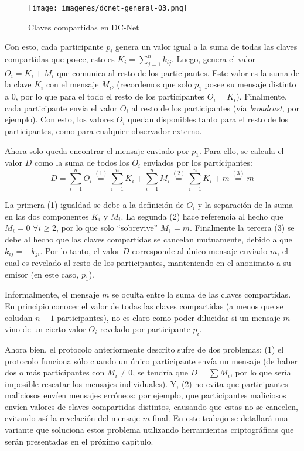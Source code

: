 \begin{figure}[H]
  \centering
    \texttt{[image: imagenes/dcnet-general-03.png]}
  \caption{Claves compartidas en DC-Net}
\end{figure}

Con esto, cada participante $p_i$ genera un valor igual a la suma de todas las claves compartidas que posee, esto es $K_i = \sum_{j=1}^n k_{ij}$. 
Luego, genera el valor $O_i = K_i + M_i$ que comunica al resto de los participantes. Este valor es la suma de la clave $K_i$ con el mensaje $M_i$, (recordemos que solo $p_1$ posee su mensaje distinto a 0, por lo que para el todo el resto de los participantes $O_i = K_i$). 
Finalmente, cada participante envia el valor $O_i$ al resto de los participantes (vía \emph{broadcast}, por ejemplo). Con esto, los 
valores $O_i$ quedan disponibles tanto para el resto de los participantes, como para cualquier observador externo.

Ahora solo queda encontrar el mensaje enviado por $p_1$. Para ello, se calcula el valor $D$ como la suma de todos los $O_i$ enviados por los 
participantes: $$D = \sum_{i=1}^n O_i \overset{(1)}{=} \sum_{i=1}^n K_i + \sum_{i=1}^n M_i \overset{(2)}{=} \sum_{i=1}^n K_i + m \overset{(3)}{=} m$$

La primera (1) igualdad se debe a la definición de $O_i$ y la separación de la suma en las dos componentes $K_i$ y $M_i$. La segunda 
(2) hace referencia al hecho que $M_i = 0$ $\forall i \geq 2$, por lo que solo ``sobrevive'' $M_1 = m$. Finalmente la tercera (3) 
se debe al hecho que las claves compartidas se cancelan mutuamente, debido a que $k_{ij} = -k_{ji}$. Por lo tanto, el 
valor $D$ corresponde al único mensaje enviado $m$, el cual es revelado al resto de los participantes, manteniendo en el anonimato a su emisor (en este caso, $p_1$).

Informalmente, el mensaje $m$ se oculta entre la suma de las claves compartidas. En principio conocer el 
valor de todas las claves compartidas (a menos que se coludan $n-1$ participantes), no es claro como poder dilucidar si un mensaje $m$ vino de un cierto valor $O_i$ revelado por participante $p_i$.

Ahora bien, el protocolo anteriormente descrito sufre de dos problemas: (1) el protocolo funciona sólo cuando un 
único participante envía un mensaje (de haber dos o más participantes con $M_i \neq 0$, se tendría que $D = \sum M_i$, por lo que sería imposible 
rescatar los mensajes individuales). Y, (2) no evita que participantes maliciosos envíen mensajes erróneos: por ejemplo, que participantes maliciosos envíen 
valores de claves compartidas distintos, causando que estas no se cancelen, evitando así la revelación del mensaje $m$ final. En este 
trabajo se detallará una variante que soluciona estos problema utilizando herramientas criptográficas que serán presentadas en el próximo capítulo.


